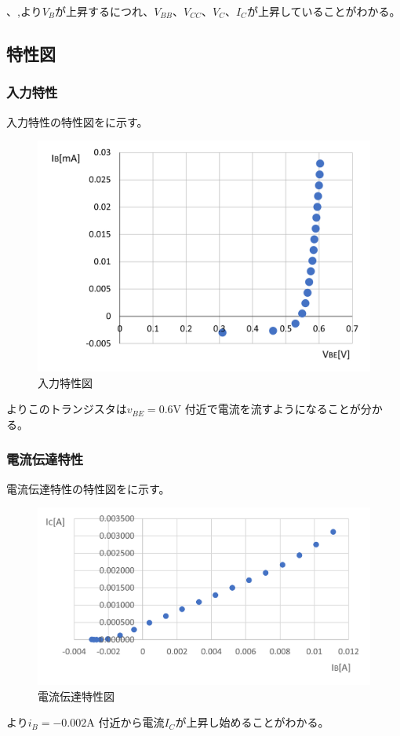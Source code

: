 \documentclass[11pt,dvipdfmx]{jarticle}
\begin{document}
		、,より$V_B$が上昇するにつれ、$V_{BB}$、$V_{CC}$、$V_C$、$I_C$が上昇していることがわかる。
	\subsection{特性図}
		\subsubsection{入力特性}
		入力特性の特性図をに示す。
		\begin{figure}[H]
			\centering
			\includegraphics[scale=0.8]{fig/入力特性図.png}
			\caption{入力特性図}
			\label{fig:入力特性図}
		\end{figure}
		よりこのトランジスタは$v_{BE} = 0.6$V 付近で電流を流すようになることが分かる。
		\subsubsection{電流伝達特性}
		電流伝達特性の特性図をに示す。
		\begin{figure}[H]
			\centering
			\includegraphics[scale=0.8]{fig/電流伝達特性図.png}
			\caption{電流伝達特性図}
			\label{fig:電流伝達特性図}
		\end{figure}
		より$i_B = -0.002$A 付近から電流$I_C$が上昇し始めることがわかる。
\end{document}
